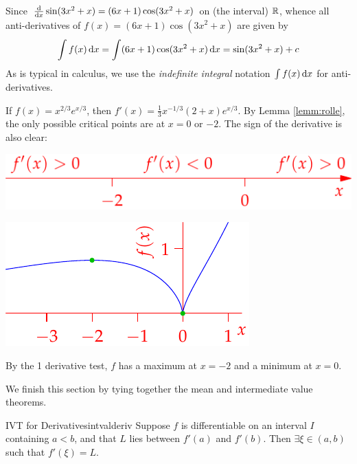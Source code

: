 \begin{examples}{}{}
	\exstart Since $\frac{\mathrm{d} }{\mathrm{d} x}\sin(3x^2+x)=(6x+1)\cos(3x^2+x)$ on (the interval) $\mathbb{R}$, whence all anti-derivatives of $f(x)=(6x+1)\cos(3x^2+x)$ are given by
	\[
		\int f(x)\,{\mathrm{d} x}=\int (6x+1)\cos(3x^2+x)\,{\mathrm{d} x}=\sin(3x^2+x)+c
	\]
	As is typical in calculus, we use the \emph{indefinite integral} notation $\int f(x)\,{\mathrm{d} x}$ for anti-derivatives.
	\begin{enumerate}\setcounter{enumi}{1}
	  \begin{minipage}[t]{0.6\linewidth}\vspace{0pt}
	  	\item If $f(x)=x^{2/3}e^{x/3}$, then $f'(x)=\frac 13x^{-1/3}(2+x)e^{x/3}$.\smallbreak
	  	By Lemma \ref{lemm:rolle}, the only possible critical points are at $x=0$ or $-2$. The sign of the derivative is also clear:
	  	\begin{center}
	  		\includegraphics[scale=0.95]{mvt-ex3}
	  	\end{center}
	  \end{minipage}
	  \hfill
	  \begin{minipage}[t]{0.39\linewidth}\vspace{0pt}
	  	\flushright\includegraphics[scale=0.95]{mvt-ex2}
	  \end{minipage}
	  \smallbreak	
		By the 1\st{} derivative test, $f$ has a maximum at $x=-2$ and a minimum at $x=0$.
	\end{enumerate}
\end{examples}

We finish this section by tying together the mean and intermediate value theorems.

\begin{thm}{IVT for Derivatives}{intvalderiv}
	Suppose $f$ is differentiable on an interval $I$ containing $a<b$, and that $L$ lies between $f'(a)$ and $f'(b)$. Then $\exists\xi\in(a,b)$ such that $f'(\xi)=L$.
\end{thm}

